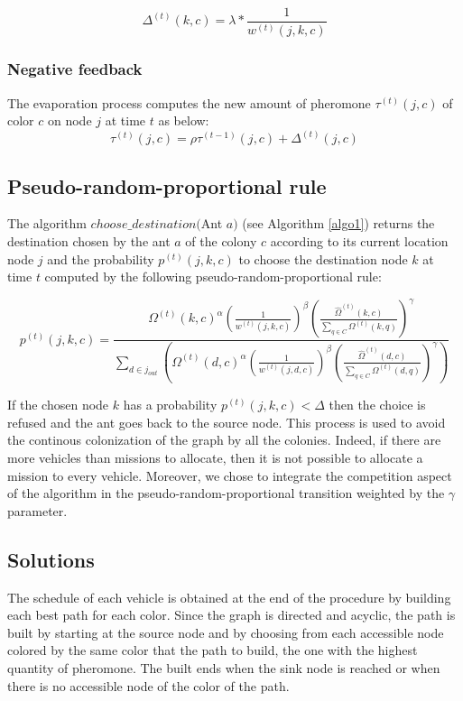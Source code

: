 \documentclass[a4paper,10pt]{article}
\begin{document}
\begin{equation*}
 \Delta^{(t)}(k,c) = \lambda * \frac{1}{w^{(t)}(j,k,c)}
\end{equation*}

\subsubsection{Negative feedback}
The evaporation process computes the new amount of pheromone $\tau^{(t)}(j,c)$ of color $c$ on node $j$ at time $t$ as below:
\begin{equation*}
 \tau^{(t)}(j,c) = \rho \tau^{(t-1)}(j,c) + \Delta^{(t)}(j,c)
\end{equation*}

\subsection{Pseudo-random-proportional rule}
The algorithm $choose\_destination($Ant $a)$ (see Algorithm \ref{algo1}) returns the destination chosen by the ant $a$ of the colony $c$ according to its current location node $j$ and the probability $p^{(t)}(j,k,c)$ to choose the destination node $k$ at time $t$ computed by the following pseudo-random-proportional rule:

\begin{equation*}
  p^{(t)}(j,k,c) = \frac
    {
      \Omega^{(t)}(k,c)^{\alpha}
      \left( \frac{1}{w^{(t)}(j,k,c)} \right) ^{\beta}
      \left( \frac{\hat \Omega^{(t)}(k,c)}{\sum_{q \in C} \Omega^{(t)}(k,q)} \right)^{\gamma}
    }
    {
      \sum_{d \in j_{out}} \left(
	\Omega^{(t)}(d,c)^{\alpha}
	\left( \frac{1}{w^{(t)}(j,d,c)} \right)^{\beta}
	\left( \frac{\hat \Omega^{(t)}(d,c)}{\sum_{q \in C} \Omega^{(t)}(d,q)} \right)^{\gamma}
      \right)
    }
\end{equation*}

If the chosen node $k$ has a probability $p^{(t)}(j,k,c) < \Delta$ then the choice is refused and the ant goes back to the source node. This process is used to avoid the continous colonization of the graph by all the colonies. Indeed, if there are more vehicles than missions to allocate, then it is not possible to allocate a mission to every vehicle. Moreover, we chose to integrate the competition aspect of the algorithm in the pseudo-random-proportional transition weighted by the $\gamma$ parameter.

\subsection{Solutions}
The schedule of each vehicle is obtained at the end of the procedure by building each best path for each color. Since the graph is directed and acyclic, the path is built by starting at the source node and by choosing from each accessible node colored by the same color that the path to build, the one with the highest quantity of pheromone. The built ends when the sink node is reached or when there is no accessible node of the color of the path.
\end{document}
